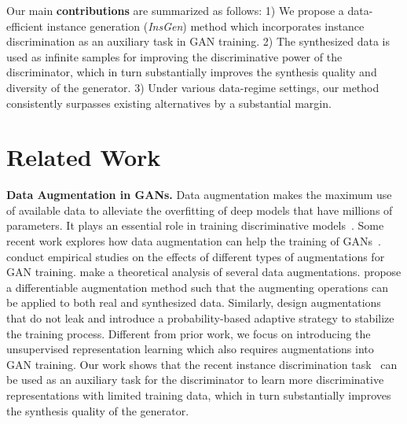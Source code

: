 \documentclass{article}
\begin{document}
Our main \textbf{contributions} are summarized as follows:
1) We propose a data-efficient instance generation (\textit{InsGen}) method which incorporates instance discrimination as an auxiliary task in GAN training.
2) The synthesized data is used as infinite samples for improving the discriminative power of the discriminator, which in turn substantially improves the synthesis quality and diversity of the generator.
3) Under various data-regime settings, our method consistently surpasses existing alternatives by a substantial margin.


\section{Related Work}\label{sec:related}


\textbf{Data Augmentation in GANs.}
Data augmentation makes the maximum use of available data to alleviate the overfitting of deep models that have millions of parameters.
It plays an essential role in training discriminative models~\cite{zhang2017mixup,cubuk2020randaugment,cubuk2018autoaugment}.
Some recent work explores how data augmentation can help the training of GANs~\cite{zhao2020image, tran2021data, zhao2020differentiable, karras2020training}.
\citet{zhao2020image} conduct empirical studies on the effects of different types of augmentations for GAN training.
\citet{tran2021data} make a theoretical analysis of several data augmentations.
\citet{zhao2020differentiable} propose a differentiable augmentation method such that the augmenting operations can be applied to both real and synthesized data.
Similarly, \citet{karras2020training} design augmentations that do not leak and introduce a probability-based adaptive strategy to stabilize the training process.
Different from prior work, we focus on introducing the unsupervised representation learning which also requires augmentations into GAN training.
Our work shows that the recent instance discrimination task~\cite{wu2018unsupervised} can be used as an auxiliary task for the discriminator to learn more discriminative representations with limited training data, which in turn substantially improves the synthesis quality of the generator.
\end{document}
